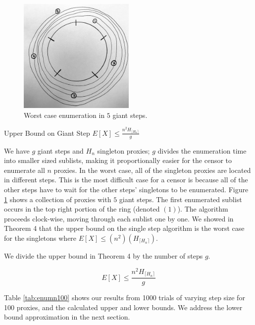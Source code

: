 \begin{figure}[h!]
\centering
     \includegraphics[width=0.5\textwidth]{fig/giant_step_upper_bound.png}
    \caption{Worst case enumeration in $5$ giant steps.}

    \label{fig:ubgs}
\end{figure}

\label{UBGS}
\begin{theorem}{Upper Bound on Giant Step $E[X] \leq \frac{n^2H_{\lceil{H_n}\rceil}}{g}$} 
\end{theorem}

We have $g$ giant steps and $H_n$ singleton proxies; $g$ divides the enumeration time into smaller sized sublists, making it proportionally easier for the censor to enumerate all $n$ proxies. In the worst case, all of the singleton proxies are located in different steps. This is the most difficult case for a censor is because all of the other steps have to wait for the other steps' singletons to be enumerated. Figure \ref{fig:ubgs} shows a collection of proxies with $5$ giant steps. The first enumerated sublist occurs in the top right portion of the ring (denoted $(1)$). The algorithm proceeds clock-wise, moving through each sublist one by one. We showed in Theorem 4 that the upper bound on the single step algorithm is the worst case for the singletons where $E[X] \leq (n^2) (H_{\lceil{H_n}\rceil})$.

We divide the upper bound in Theorem 4 by the number of steps $g$.

$$E[X] \leq \frac{ n^2H_{\lceil{H_n}\rceil}}{g}$$

Table \ref{tab:enumn100} shows our results from 1000 trials of varying step size for 100 proxies, and the calculated upper and lower bounds. We address the lower bound approximation in the next section.

